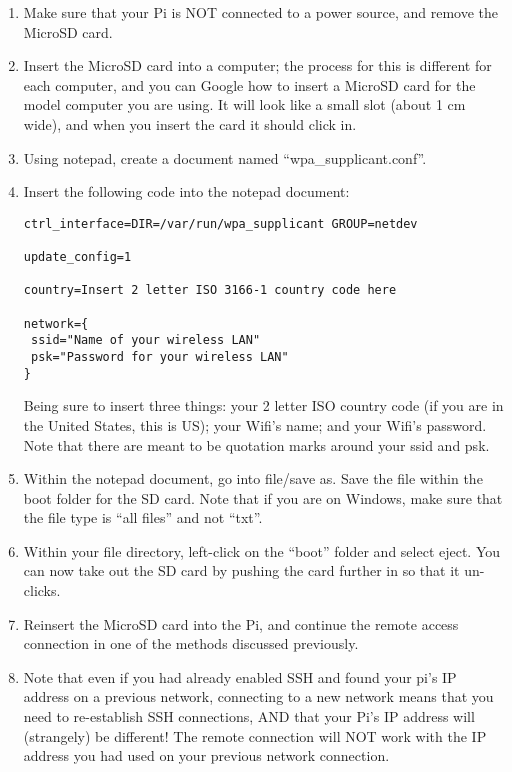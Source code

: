 \documentclass{article}\usepackage[]{graphicx}\usepackage[]{color}
\begin{document}
\begin{enumerate}

\item Make sure that your Pi is NOT connected to a power source, and remove the MicroSD card.

\item Insert the MicroSD card into a computer; the process for this is different for each computer, and you can Google how to insert a MicroSD card for the model computer you are using.  It will look like a small slot (about 1 cm wide), and when you insert the card it should click in.

\item Using notepad, create a document named ``wpa\_supplicant.conf''. 

\item Insert the following code into the notepad document:

\begin{lstlisting}
ctrl_interface=DIR=/var/run/wpa_supplicant GROUP=netdev

update_config=1

country=Insert 2 letter ISO 3166-1 country code here

network={
 ssid="Name of your wireless LAN"
 psk="Password for your wireless LAN"
}
\end{lstlisting}

Being sure to insert three things: your 2 letter ISO country code (if you are in the United States, this is US); your Wifi's name; and your Wifi's password.  Note that there are meant to be quotation marks around your ssid and psk.

\item Within the notepad document, go into file/save as.  Save the file within the boot folder for the SD card.  Note that if you are on Windows, make sure that the file type is ``all files'' and not ``txt''.

\item Within your file directory, left-click on the ``boot'' folder and select eject.  You can now take out the SD card by pushing the card further in so that it un-clicks.

\item Reinsert the MicroSD card into the Pi, and continue the remote access connection in one of the methods discussed previously.

\item Note that even if you had already enabled SSH and found your pi's IP address on a previous network, connecting to a new network means that you need to re-establish SSH connections, AND that your Pi's IP address will (strangely) be different!  The remote connection will NOT work with the IP address you had used on your previous network connection.

\end{enumerate}
\end{document}
